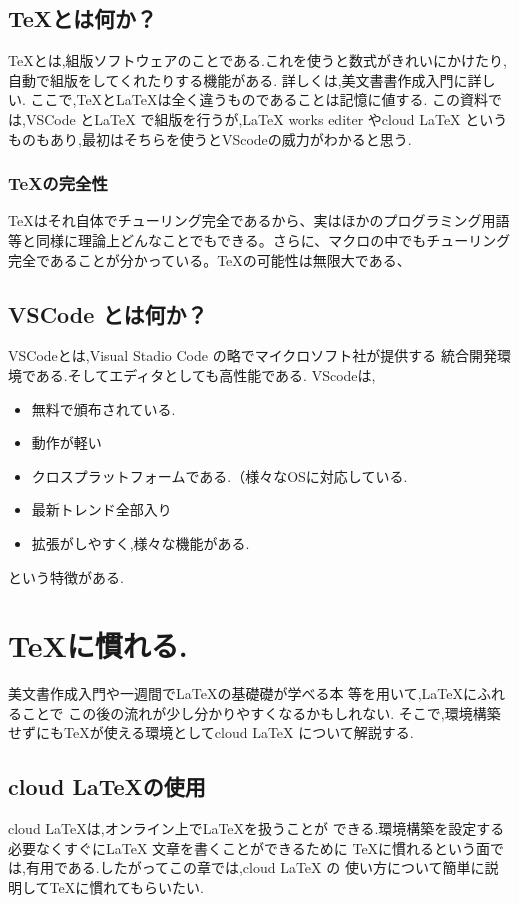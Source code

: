 \documentclass{ltjsarticle}
\begin{document}
\subsection{\TeX とは何か？}
\TeX とは,組版ソフトウェアのことである.これを使うと数式がきれいにかけたり,
自動で組版をしてくれたりする機能がある.
詳しくは,美文書書作成入門\cite{美文書本}に詳しい.
ここで,\TeX と\LaTeX は全く違うものであることは記憶に値する.
この資料では,VSCode とLaTeX で組版を行うが,LaTeX works editer やcloud LaTeX 
というものもあり,最初はそちらを使うとVScodeの威力がわかると思う.
\subsubsection*{\TeX の完全性}
\TeX はそれ自体でチューリング完全であるから、実はほかのプログラミング用語等と同様に理論上どんなことでもできる。さらに、マクロの中でもチューリング完全であることが分かっている。\TeX の可能性は無限大である、
\subsection{VSCode とは何か？}
VSCodeとは,Visual Stadio Code の略でマイクロソフト社が提供する
統合開発環境である.そしてエディタとしても高性能である.
VScodeは,
\begin{itemize}
  \item 無料で頒布されている.
  \item 動作が軽い
  \item クロスプラットフォームである.（様々なOSに対応している.
  \item 最新トレンド全部入り
  \item 拡張がしやすく,様々な機能がある.
\end{itemize}
という特徴がある.
\section{\TeX に慣れる.}
美文書作成入門\cite{美文書本}や一週間で\LaTeX の基礎礎が学べる本
\cite{一週間基礎}等を用いて,\LaTeX にふれることで
この後の流れが少し分かりやすくなるかもしれない.
そこで,環境構築せずにも\TeX が使える環境としてcloud \LaTeX 
について解説する.
\subsection{cloud \LaTeX の使用}
cloud \LaTeX は,オンライン上で\LaTeX を扱うことが
できる.環境構築を設定する必要なくすぐにLaTeX 文章を書くことができるために
TeXに慣れるという面では,有用である.したがってこの章では,cloud LaTeX の
使い方について簡単に説明して\TeX に慣れてもらいたい.
\end{document}
